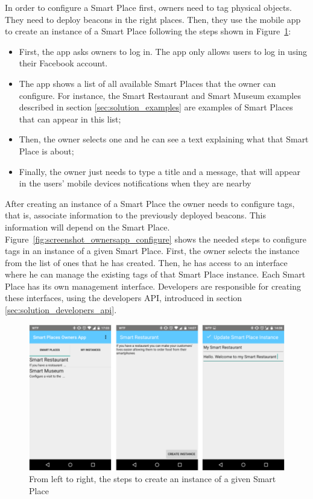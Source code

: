 In order to configure a Smart Place first, owners need to tag physical objects.
They need to deploy beacons in the right places.
Then, they use the mobile app to create an instance of a Smart Place following the steps shown in Figure~\ref{fig:screenshot_ownersapp}:
\begin{itemize}
  \item First, the app asks owners to log in.
  The app only allows users to log in using their Facebook account.
  \item The app shows a list of all available Smart Places that the owner can configure.
  For instance, the Smart Restaurant and Smart Museum examples described in section \ref{sec:solution_examples} are examples of Smart Places that can appear in this list;
  \item Then, the owner selects one and he can see a text explaining what that Smart Place is about;
  \item Finally, the owner just needs to type a title and a message, that will appear in the users' mobile devices notifications when they are nearby
\end{itemize}

After creating an instance of a Smart Place the owner needs to configure tags, that is, associate information to the previously deployed beacons.
This information will depend on the Smart Place.
Figure~\ref{fig:screenshot_ownersapp_configure} shows the needed steps to configure tags in an instance of a given Smart Place.
First, the owner selects the instance from the list of ones that he has created.
Then, he has access to an interface where he can manage the existing tags of that Smart Place instance.
Each Smart Place has its own management interface.
Developers are responsible for creating these interfaces, using the developers \gls{API}, introduced in section \ref{sec:solution_developers_api}.

\begin{figure}[!ht]
  \centering
    \includegraphics[width=1\textwidth, keepaspectratio]{images/screenshots/ownersapp}
    \caption[Create a Smart Place Instance]{From left to right, the steps to create an instance of a given Smart Place}
    \label{fig:screenshot_ownersapp}
\end{figure}

